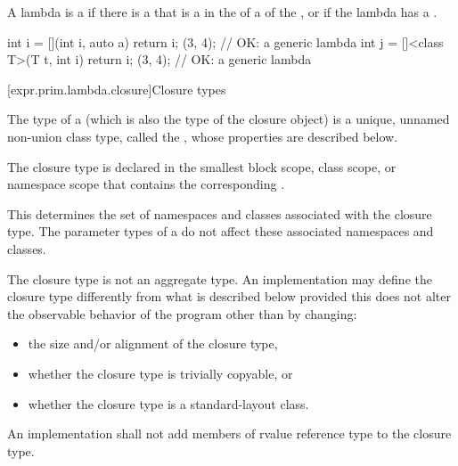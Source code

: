 \pnum
A lambda is a 
if there is a  that is
a  in
the  of a
 of the ,
or if the lambda has a .
\begin{example}
\begin{codeblock}
int i = [](int i, auto a) { return i; }(3, 4);                  // OK: a generic lambda
int j = []<class T>(T t, int i) { return i; }(3, 4);            // OK: a generic lambda
\end{codeblock}
\end{example}

[expr.prim.lambda.closure]{Closure types}%

\pnum
The type of a  (which is also the type of the
closure object) is a unique, unnamed non-union class type,
called the ,
whose properties are described below.

\pnum
The closure type is declared in the smallest block
scope, class scope, or namespace scope that contains the corresponding
.
\begin{note}
This determines the set of namespaces and
classes associated with the closure type. The parameter
types of a  do not affect these associated namespaces and
classes.
\end{note}
The closure type is not an aggregate type.
An implementation may define the closure type differently from what
is described below provided this does not alter the observable behavior of the program
other than by changing:
\begin{itemize}
\item the size and/or alignment of the closure type,

\item whether the closure type is trivially copyable, or

\item whether the closure type is a standard-layout class.
\end{itemize}

An implementation shall not add members of rvalue reference type to the closure
type.

